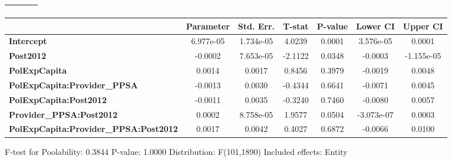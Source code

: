 \begin{center}
\begin{tabular}{lclc}
\textbf{}                                     &                    & \textbf{                     }   &                  \\
\bottomrule
\end{tabular}
\begin{tabular}{lcccccc}
                                              & \textbf{Parameter} & \textbf{Std. Err.} & \textbf{T-stat} & \textbf{P-value} & \textbf{Lower CI} & \textbf{Upper CI}  \\
\midrule
\textbf{Intercept}                            &     6.977e-05      &     1.734e-05      &      4.0239     &      0.0001      &     3.576e-05     &       0.0001       \\
\textbf{Post2012}                             &      -0.0002       &     7.653e-05      &     -2.1122     &      0.0348      &      -0.0003      &     -1.155e-05     \\
\textbf{PolExpCapita}                         &       0.0014       &       0.0017       &      0.8456     &      0.3979      &      -0.0019      &       0.0048       \\
\textbf{PolExpCapita:Provider\_PPSA}          &      -0.0013       &       0.0030       &     -0.4344     &      0.6641      &      -0.0071      &       0.0045       \\
\textbf{PolExpCapita:Post2012}                &      -0.0011       &       0.0035       &     -0.3240     &      0.7460      &      -0.0080      &       0.0057       \\
\textbf{Provider\_PPSA:Post2012}              &       0.0002       &     8.758e-05      &      1.9577     &      0.0504      &     -3.073e-07    &       0.0003       \\
\textbf{PolExpCapita:Provider\_PPSA:Post2012} &       0.0017       &       0.0042       &      0.4027     &      0.6872      &      -0.0066      &       0.0100       \\
\bottomrule
\end{tabular}
\end{center}

F-test for Poolability: 0.3844 \newline
 P-value: 1.0000 \newline
 Distribution: F(101,1890) \newline
  \newline
 Included effects: Entity